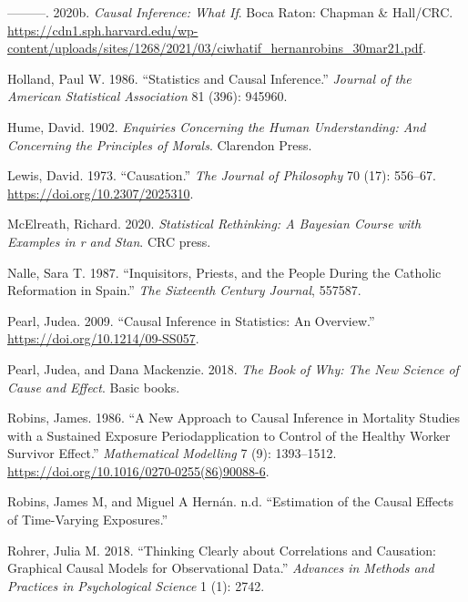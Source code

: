 \documentclass[
  singlecolumn]{report}
\newlength{\cslhangindent}
\newlength{\cslentryspacingunit} %
\newenvironment{CSLReferences}[2] %
 {%
  \setlength{\parindent}{0pt}
  \ifodd #1
  \let\oldpar\par
  \def\par{\hangindent=\cslhangindent\oldpar}
  \fi
  \setlength{\parskip}{#2\cslentryspacingunit}
 }%
 {}
\begin{document}
\begin{CSLReferences}{1}{0}
\leavevmode{}%
---------. 2020b. \emph{Causal Inference: What If}. Boca Raton: Chapman
\& Hall/CRC.
\url{https://cdn1.sph.harvard.edu/wp-content/uploads/sites/1268/2021/03/ciwhatif_hernanrobins_30mar21.pdf}.

\leavevmode{}%
Holland, Paul W. 1986. {``Statistics and Causal Inference.''}
\emph{Journal of the American Statistical Association} 81 (396): 945960.

\leavevmode{}%
Hume, David. 1902. \emph{Enquiries Concerning the Human Understanding:
And Concerning the Principles of Morals}. Clarendon Press.

\leavevmode{}%
Lewis, David. 1973. {``Causation.''} \emph{The Journal of Philosophy} 70
(17): 556--67. \url{https://doi.org/10.2307/2025310}.

\leavevmode{}%
McElreath, Richard. 2020. \emph{Statistical Rethinking: A Bayesian
Course with Examples in r and Stan}. CRC press.

\leavevmode{}%
Nalle, Sara T. 1987. {``Inquisitors, Priests, and the People During the
Catholic Reformation in Spain.''} \emph{The Sixteenth Century Journal},
557587.

\leavevmode{}%
Pearl, Judea. 2009. {``Causal Inference in Statistics: An Overview.''}
\url{https://doi.org/10.1214/09-SS057}.

\leavevmode{}%
Pearl, Judea, and Dana Mackenzie. 2018. \emph{The Book of Why: The New
Science of Cause and Effect}. Basic books.

\leavevmode{}%
Robins, James. 1986. {``A New Approach to Causal Inference in Mortality
Studies with a Sustained Exposure Period{\textemdash}application to
Control of the Healthy Worker Survivor Effect.''} \emph{Mathematical
Modelling} 7 (9): 1393--1512.
\url{https://doi.org/10.1016/0270-0255(86)90088-6}.

\leavevmode{}%
Robins, James M, and Miguel A Hernán. n.d. {``Estimation of the Causal
Effects of Time-Varying Exposures.''}

\leavevmode{}%
Rohrer, Julia M. 2018. {``Thinking Clearly about Correlations and
Causation: Graphical Causal Models for Observational Data.''}
\emph{Advances in Methods and Practices in Psychological Science} 1 (1):
2742.


\end{CSLReferences}
\end{document}
